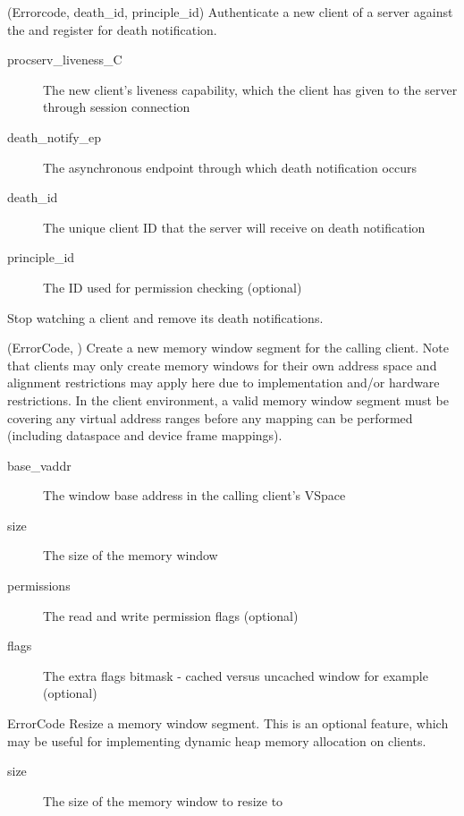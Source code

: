 \begin{description}
	\item {} 
	   {(Errorcode, death\_id, principle\_id)}   
    Authenticate a new client of a server against the  and register for death
    notification.
    \begin{description}
        \item [procserv\_liveness\_C] The new client's liveness capability, which the client has given to the server through session connection
        \item [death\_notify\_ep] The asynchronous endpoint through which death notification occurs
        \item [death\_id] The unique client ID that the server will receive on death notification
        \item [principle\_id] The ID used for permission checking (optional)
    \end{description}

    \item {}
    Stop watching a client and remove its death notifications.

	\item {}
	   {(ErrorCode, )}
	Create a new memory window segment for the calling client. Note that clients may only create memory windows for their own address space and alignment restrictions may apply here due to implementation and/or hardware restrictions. In the  client environment, a valid memory window segment must be covering any virtual address ranges before any mapping can be performed (including dataspace and device frame mappings).
    \begin{description}
        \item [base\_vaddr] The window base address in the calling client's VSpace
        \item [size] The size of the memory window
        \item [permissions] The read and write permission flags (optional)
        \item [flags] The extra flags bitmask - cached versus uncached window for example (optional)
    \end{description}

    \item {}
        {ErrorCode}
    Resize a memory window segment. This is an optional feature, which may be useful for implementing dynamic heap memory allocation on clients.
    \begin{description}
        \item [size] The size of the memory window to resize to
    \end{description}


\end{description}
